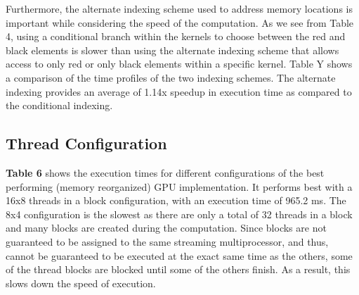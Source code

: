 \documentclass[english]{article}
\begin{document}
	\begin{center}
	\end{center}

	Furthermore, the alternate indexing scheme used to address memory locations is important while considering the speed of the computation. As we see from Table 4, using a conditional branch within the kernels to choose between the red and black elements is slower than using the alternate indexing scheme that allows access to only red or only black elements within a specific kernel. Table Y shows a comparison of the time profiles of the two indexing schemes. The alternate indexing provides an average of 1.14x speedup in execution time as compared to the conditional indexing.

	\begin{center}
	\end{center}

	\subsection{Thread Configuration}
	\textbf{Table 6} shows the execution times for different configurations of the best performing (memory reorganized) GPU implementation. It performs best with a 16x8 threads in a block configuration, with an execution time of 965.2 ms. The 8x4 configuration is the slowest as there are only a total of 32 threads in a block and many blocks are created during the computation. Since blocks are not guaranteed to be assigned to the same streaming multiprocessor, and thus, cannot be guaranteed to be executed at the exact same time as the others, some of the thread blocks are blocked until some of the others finish. As a result, this slows down the speed of execution. 

	\begin{center}
	\end{center}

	\begin{center}
	\end{center}
\end{document}
